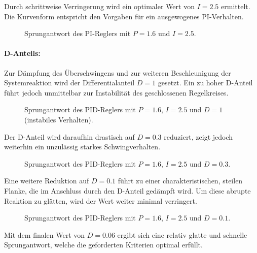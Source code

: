\documentclass[11pt,a4paper]{article}
\begin{document}
Durch schrittweise Verringerung wird ein optimaler Wert von $I = 2.5$ ermittelt. Die Kurvenform entspricht den Vorgaben für ein ausgewogenes PI-Verhalten.

\begin{figure}[H]
    \centering

    
    \caption{Sprungantwort des PI-Reglers mit $P=1.6$ und $I=2.5$.}
    \label{fig:step_response_I2.5}
\end{figure}

\paragraph{D-Anteils:}
Zur Dämpfung des Überschwingens und zur weiteren Beschleunigung der Systemreaktion wird der Differentialanteil $D = 1$ gesetzt. Ein zu hoher D-Anteil führt jedoch unmittelbar zur Instabilität des geschlossenen Regelkreises.

\begin{figure}[H]
    \centering

    
    \caption{Sprungantwort des PID-Reglers mit $P=1.6$, $I=2.5$ und $D=1$ (instabiles Verhalten).}
    \label{fig:step_response_D1}
\end{figure}

Der D-Anteil wird daraufhin drastisch auf $D = 0.3$ reduziert, zeigt jedoch weiterhin ein unzulässig starkes Schwingverhalten.

\begin{figure}[H]
    \centering

    
    \caption{Sprungantwort des PID-Reglers mit $P=1.6$, $I=2.5$ und $D=0.3$.}
    \label{fig:step_response_D0k3}
\end{figure}

Eine weitere Reduktion auf $D = 0.1$ führt zu einer charakteristischen, steilen Flanke, die im Anschluss durch den D-Anteil gedämpft wird. Um diese abrupte Reaktion zu glätten, wird der Wert weiter minimal verringert.

\begin{figure}[H]
    \centering

    
    \caption{Sprungantwort des PID-Reglers mit $P=1.6$, $I=2.5$ und $D=0.1$.}
    \label{fig:step_response_D0k1}
\end{figure}

Mit dem finalen Wert von $D = 0.06$ ergibt sich eine relativ glatte und schnelle Sprungantwort, welche die geforderten Kriterien optimal erfüllt.
\end{document}
